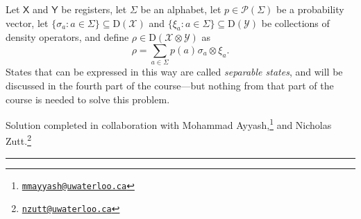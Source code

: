 \documentclass[boxes,pages,color=SeaGreen]{homework}
\newcommand{\collab}[1]{\footnote{\href{mailto:#1}{\texttt{#1}}}}
\newcommand{\tinyspace}{\mspace{1mu}}
\renewcommand{\op}[1]{\operatorname{#1}}
\newcommand{\X}{\mathcal{X}}
\newcommand{\Y}{\mathcal{Y}}
\renewcommand{\P}{\mathcal{P}}
\newcommand{\reg}[1]{\mathsf{#1}}
\newcommand{\Density}{\mathrm{D}}
\begin{document}
\begin{problem}
Let $\reg{X}$ and $\reg{Y}$ be registers, let $\Sigma$ be an alphabet,
let $p\in\P(\Sigma)$ be a probability vector, let
$\{\sigma_a : a\in\Sigma\}\subseteq\Density(\X)$ and
$\{\xi_a : a\in\Sigma\}\subseteq\Density(\Y)$ be collections of density
operators, and define $\rho\in\Density(\X\otimes\Y)$ as
\begin{equation*}
    \rho = \sum_{a\in\Sigma} p(a)\tinyspace\sigma_a\otimes\xi_a.
\end{equation*}
States that can be expressed in this way are called \emph{separable states},
and will be discussed in the fourth part of the course---but nothing from
that part of the course is needed to solve this problem.

\end{problem}

\noindent Solution completed in collaboration with Mohammad Ayyash,\collab{mmayyash@uwaterloo.ca} and Nicholas Zutt.\collab{nzutt@uwaterloo.ca}

{\noindent\color{SeaGreen!30}\rule{\textwidth}{1.5pt}}
\end{document}
